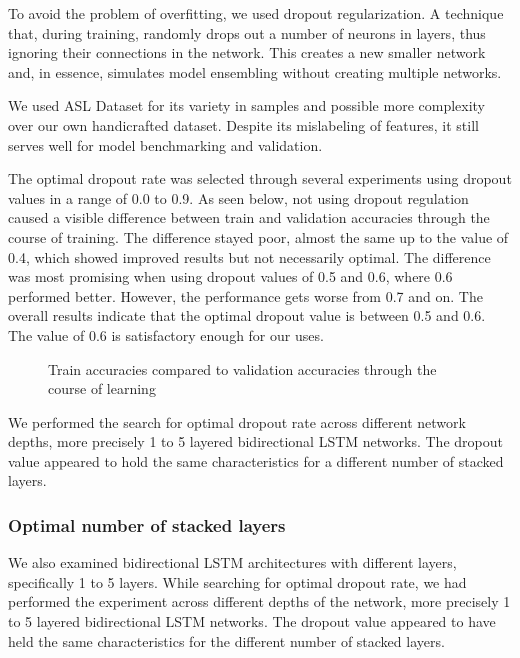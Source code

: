 To avoid the problem of overfitting, we used dropout regularization. 
A technique that, during training, randomly drops out a number of neurons in layers, thus ignoring their connections in the network. This creates a new smaller network and, in essence, simulates model ensembling without creating multiple networks.

We used ASL Dataset for its variety in samples and possible more complexity over our own handicrafted dataset. Despite its mislabeling of features, it still serves well for model benchmarking and validation.

The optimal dropout rate was selected through several experiments using dropout values in a range of 0.0 to 0.9. As seen below, not using dropout regulation caused a visible difference between train and validation accuracies through the course of training. The difference stayed poor, almost the same up to the value of 0.4, which showed improved results but not necessarily optimal. The difference was most promising when using dropout values of 0.5 and 0.6, where 0.6 performed better. However, the performance gets worse from 0.7 and on. The overall results indicate that the optimal dropout value is between 0.5 and 0.6. The value of 0.6 is satisfactory enough for our uses.

\begin{figure}[h]
	\centering
    \qquad
    \caption{Train accuracies compared to validation accuracies through the course of learning}
\end{figure}

We performed the search for optimal dropout rate across different network depths, more precisely 1 to 5 layered bidirectional LSTM networks. The dropout value appeared to hold the same characteristics for a different number of stacked layers.

\subsubsection{Optimal number of stacked layers}

We also examined bidirectional LSTM architectures with different layers, specifically 1 to 5 layers. While searching for optimal dropout rate, we had performed the experiment across different depths of the network, more precisely 1 to 5 layered bidirectional LSTM networks. The dropout value appeared to have held the same characteristics for the different number of stacked layers.

